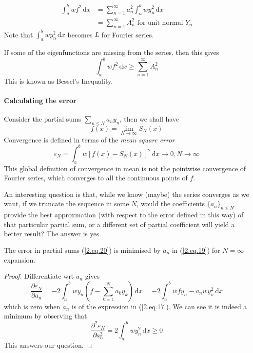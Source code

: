 \documentclass[a4paper]{article}
\renewcommand{\epsilon}{\varepsilon}
\begin{document}
\begin{align}\label{2.eq.19}
    \int_a^bwf^2\,\mathrm dx&=\sum_{n=1}^\infty a_n^2\int_a^bwy_n^2\,\mathrm dx\\ 
    &=\sum_{n=1}^\infty A_n^2\text{ for unit normal $Y_n$}\nonumber
\end{align}
Note that $\int_a^bwy_n^2\,\mathrm dx$ becomes $L$ for Fourier series.

If some of the eigenfunctions are missing from the series, then this gives
$$\int_a^bwf^2\,\mathrm dx\ge\sum_{n=1}^\infty A_n^2$$
This is known as Bessel's Inequality.
\paragraph{Calculating the error}
Consider the partial sums $\sum_{n\le N}a_ny_n$, then we shall have
\begin{equation}\label{2.eq.20}
    f(x) = \lim_{N \to \infty} S_N(x)
\end{equation}
Convergence is defined in terms of the \textit{mean square error}
\[
    \epsilon_N=\int_a^bw[f(x)-S_N(x)]^2\,\mathrm dx\to 0,N\to\infty
\]
This global definition of convergence in mean is not the pointwise convergence of Fourier series, which converges to all the continuous points of $f$.

An interesting question is that, while we know (maybe) the series converges as we want, if we truncate the sequence in some $N$, would the coefficients $\{a_n\}_{n\le N}$ provide the best approxmation (with respect to the error defined in this way) of that particular partial sum, or a different set of partial coefficient will yield a better result?
The answer is yes. 
\begin{claim}
    The error in partial sums (\ref{2.eq.20}) is minimised by $a_n$ in (\ref{2.eq.19}) for $ N= \infty  $ expansion.
\end{claim}
\begin{proof}
    Differentiate wrt $a_n$ gives
    $$\frac{\partial\epsilon_N}{\partial a_n}=-2\int_a^bwy_n\left( f-\sum_{k=1}^Na_ky_k \right)\,\mathrm dx=-2\int_a^bwfy_n-a_nwy_n^2\,\mathrm dx$$
    which is zero when $a_n$ is of the expression in (\ref{2.eq.17}).
    We can see it is indeed a minimum by observing that
    $$\frac{\partial^2\epsilon_N}{\partial a_n^2}=2\int_a^bwy_n^2\,\mathrm dx\ge 0$$
    This answers our question.
\end{proof}
\end{document}
